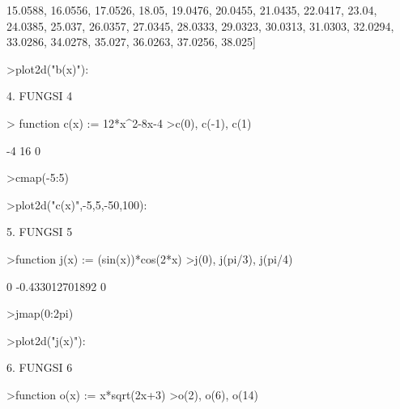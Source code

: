 \documentclass[a4paper,10pt]{article}
\begin{document}
\begin{eulernotebook}
\begin{eulercomment}
\begin{eulercomment}
\begin{eulercomment}
\begin{eulercomment}
\begin{euleroutput}
  15.0588,  16.0556,  17.0526,  18.05,  19.0476,  20.0455,  21.0435,
  22.0417,  23.04,  24.0385,  25.037,  26.0357,  27.0345,  28.0333,
  29.0323,  30.0313,  31.0303,  32.0294,  33.0286,  34.0278,  35.027,
  36.0263,  37.0256,  38.025]
\end{euleroutput}
\begin{eulerprompt}
>plot2d("b(x)"):
\end{eulerprompt}
\begin{eulercomment}
4. FUNGSI 4
\end{eulercomment}
\begin{eulerprompt}
> function c(x) := 12*x^2-8x-4
>c(0), c(-1), c(1)
\end{eulerprompt}
\begin{euleroutput}
  -4
  16
  0
\end{euleroutput}
\begin{eulerprompt}
>cmap(-5:5)
\end{eulerprompt}
\begin{euleroutput}
  [336,  220,  128,  60,  16,  -4,  0,  28,  80,  156,  256]
\end{euleroutput}
\begin{eulerprompt}
>plot2d("c(x)",-5,5,-50,100):
\end{eulerprompt}
\begin{eulercomment}
5. FUNGSI 5
\end{eulercomment}
\begin{eulerprompt}
>function j(x) := (sin(x))*cos(2*x)
>j(0), j(pi/3), j(pi/4)
\end{eulerprompt}
\begin{euleroutput}
  0
  -0.433012701892
  0
\end{euleroutput}
\begin{eulerprompt}
>jmap(0:2pi)
\end{eulerprompt}
\begin{euleroutput}
  [0,  -0.350175,  -0.594356,  0.135499,  0.110115,  0.804606,  -0.235786]
\end{euleroutput}
\begin{eulerprompt}
>plot2d("j(x)"):
\end{eulerprompt}
\begin{eulercomment}
6. FUNGSI 6
\end{eulercomment}
\begin{eulerprompt}
>function o(x) := x*sqrt(2x+3)
>o(2), o(6), o(14)

\end{eulerprompt}
\end{eulercomment}
\end{eulercomment}
\end{eulercomment}
\end{eulercomment}
\end{eulernotebook}
\end{document}
